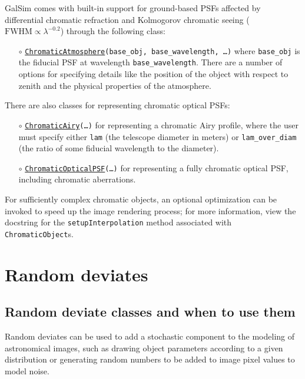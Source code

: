 \documentclass[preprint,10pt]{../../devel/modules/aastex}
\begin{document}
GalSim comes with built-in support for ground-based PSFs affected by differential chromatic
refraction and Kolmogorov chromatic seeing ($\mathrm{FWHM} \propto \lambda^{-0.2}$) through the
following class:
\begin{itemize}
  \item[$\circ$]
  \texttt{\href{http://galsim-developers.github.io/GalSim/classgalsim_1_1chromatic_1_1_chromatic_atmosphere.html}{ChromaticAtmosphere}\texttt{(base\_obj, base\_wavelength, \dots)}}
    \newline
    where \texttt{base\_obj} is the fiducial PSF at wavelength \texttt{base\_wavelength}.
    There are a number of options for specifying details like the position of the object with
    respect to zenith and the physical properties of the atmosphere.
\end{itemize}

There are also classes for representing chromatic optical PSFs:
\begin{itemize}
   \item[$\circ$]
   \texttt{\href{http://galsim-developers.github.io/GalSim/classgalsim_1_1chromatic_1_1_chromatic_airy.html}{ChromaticAiry}\texttt{(\dots)}}
    \newline
   for representing a chromatic Airy profile, where the user must specify either \texttt{lam} (the
   telescope diameter in meters) or \texttt{lam\_over\_diam} (the ratio of some fiducial wavelength
   to the diameter).
   \item[$\circ$]
   \texttt{\href{http://galsim-developers.github.io/GalSim/classgalsim_1_1chromatic_1_1_chromatic_optical_p_s_f.html}{ChromaticOpticalPSF}\texttt{(\dots)}}
    \newline
   for representing a fully chromatic optical PSF, including chromatic aberrations.
\end{itemize}

For sufficiently complex chromatic objects, an optional optimization can be invoked to speed up the
image rendering process; for more information, view the docstring for the
\texttt{setupInterpolation} method associated with \texttt{ChromaticObject}s.

\section{Random deviates}\label{sect:random}
\subsection{Random deviate classes and when to use them}
Random deviates can be used to add a stochastic
component to the modeling of astronomical images, such as drawing
object parameters according to a given distribution or generating random
numbers to be added to image pixel values to model noise.
\end{document}
